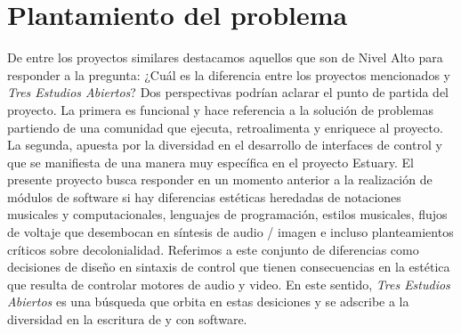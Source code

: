 \section*{Plantamiento del problema}

De entre los proyectos similares destacamos aquellos que son de Nivel Alto para responder a la pregunta: ¿Cuál es la diferencia entre los proyectos mencionados y \textit{Tres Estudios Abiertos}? Dos perspectivas podrían aclarar el punto de partida del proyecto. La primera es funcional y hace referencia a la solución de problemas partiendo de una comunidad que ejecuta, retroalimenta y enriquece al proyecto. La segunda, apuesta por la diversidad en el desarrollo de interfaces de control y que se manifiesta de una manera muy específica en el proyecto Estuary. El presente proyecto busca responder en un momento anterior a la realización de módulos de software si hay diferencias estéticas heredadas de notaciones musicales y computacionales, lenguajes de programación,  estilos musicales, flujos de voltaje que desembocan en síntesis de audio / imagen e incluso planteamientos críticos sobre decolonialidad. Referimos a este conjunto de diferencias como decisiones de diseño en sintaxis de control que tienen consecuencias en la estética que resulta de controlar motores de audio y video. En este sentido, \textit{Tres Estudios Abiertos} es una búsqueda que orbita en estas desiciones y se adscribe a la diversidad en la escritura de y con software. 
